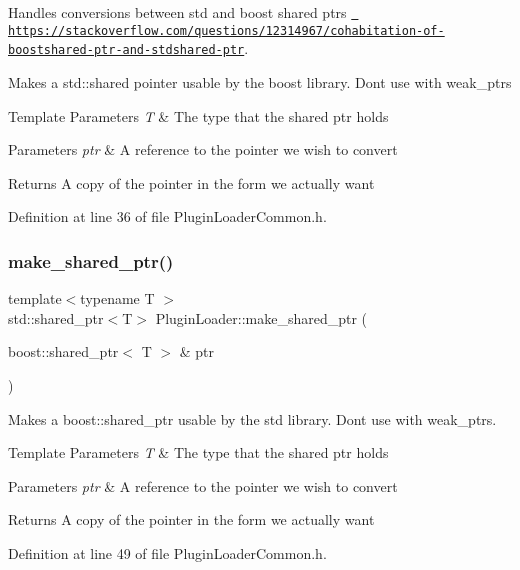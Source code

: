 Handles conversions between std and boost shared ptrs \href{https://stackoverflow.com/questions/12314967/cohabitation-of-boostshared-ptr-and-stdshared-ptr}{\texttt{ https\+://stackoverflow.\+com/questions/12314967/cohabitation-\/of-\/boostshared-\/ptr-\/and-\/stdshared-\/ptr}}. 

Makes a std\+::shared pointer usable by the boost library. Don\textquotesingle{}t use with weak\+\_\+ptr\textquotesingle{}s 
\begin{DoxyTemplParams}{Template Parameters}
{\em T} & The type that the shared ptr holds \\
\hline
\end{DoxyTemplParams}

\begin{DoxyParams}{Parameters}
{\em ptr} & A reference to the pointer we wish to convert \\
\hline
\end{DoxyParams}
\begin{DoxyReturn}{Returns}
A copy of the pointer in the form we actually want 
\end{DoxyReturn}


Definition at line 36 of file Plugin\+Loader\+Common.\+h.

\mbox{\label{namespacePluginLoader_a9dba05dcd4d2e715ccb9951017354c73}} 
\subsubsection{\texorpdfstring{make\_shared\_ptr()}{make\_shared\_ptr()}\hspace{0.1cm}{\footnotesize\ttfamily [2/2]}}
{\footnotesize\ttfamily template$<$typename T $>$ \\
std\+::shared\+\_\+ptr$<$T$>$ Plugin\+Loader\+::make\+\_\+shared\+\_\+ptr (\begin{DoxyParamCaption}\item[{boost\+::shared\+\_\+ptr$<$ T $>$ \&}]{ptr }\end{DoxyParamCaption})}



Makes a boost\+::shared\+\_\+ptr usable by the std library. Don\textquotesingle{}t use with weak\+\_\+ptr\textquotesingle{}s. 


\begin{DoxyTemplParams}{Template Parameters}
{\em T} & The type that the shared ptr holds \\
\hline
\end{DoxyTemplParams}

\begin{DoxyParams}{Parameters}
{\em ptr} & A reference to the pointer we wish to convert \\
\hline
\end{DoxyParams}
\begin{DoxyReturn}{Returns}
A copy of the pointer in the form we actually want 
\end{DoxyReturn}


Definition at line 49 of file Plugin\+Loader\+Common.\+h.

